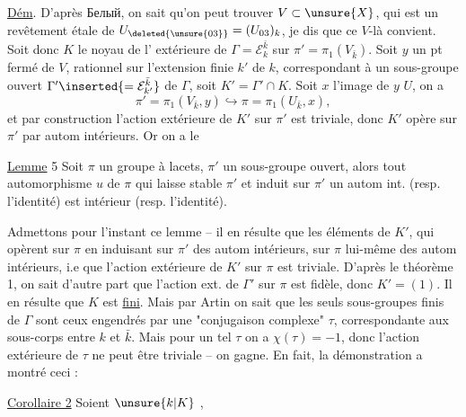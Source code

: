 

\uline{Dém}. D'après Белый, on sait qu'on peut trouver $V\subset\unsure{X}$, qui est un revêtement étale de $U_{\deleted{\unsure{03}}}=(U_{03})_k$, je dis que ce $V$-là convient. Soit donc $K$ le noyau de l' extérieure de $\Gamma=\mathcal E_k^{\bar k}$ sur $\pi'=\pi_1(V_{\bar k})$. Soit $y$ un pt fermé de $V$, rationnel sur l'extension finie $k'$ de $k$, correspondant à un sous-groupe ouvert $\Gamma'\inserted{=\mathcal E_{k'}^{\bar k}}$ de $\Gamma$, soit $K'=\Gamma'\cap K$. Soit $x$ l'image de $y$  $U$, on a
\[
\pi'=\pi_1(V_{\bar k},y)\hookrightarrow\pi=\pi_1(U_{\bar k},x),
\]
et par construction l'action extérieure de $K'$ sur $\pi'$ est triviale, donc $K'$ opère sur $\pi'$ par autom intérieurs. Or on a le

\uline{Lemme} 5 Soit $\pi$ un groupe  à lacets, $\pi'$ un sous-groupe ouvert, alors tout automorphisme $u$ de $\pi$ qui laisse stable $\pi'$ et induit sur $\pi'$ un autom int. (resp. l'identité) est intérieur (resp. l'identité).



Admettons pour l'instant ce lemme -- il en résulte que les éléments de $K'$, qui opèrent sur $\pi$ en induisant sur $\pi'$ des autom intérieurs,  sur $\pi$ lui-même des autom intérieurs, i.e que l'action extérieure de $K'$ sur $\pi$ est triviale. D'après le théorème 1, on sait d'autre part que l'action ext. de $\Gamma'$ sur $\pi$ est fidèle, donc $K'=(1)$. Il en résulte que $K$ est \uline{fini}. Mais par Artin on sait que les seuls sous-groupes finis  de $\Gamma$ sont ceux engendrés par une "conjugaison  complexe" $\tau$, correspondante aux sous-corps   entre $k$ et $\bar k$. Mais pour un tel $\tau$ on a $\chi(\tau)=-1$, donc l'action extérieure de $\tau$ ne peut être triviale -- on gagne. En fait, la démonstration a montré ceci :

\uline{Corollaire 2} Soient $\unsure{k|K}$  ,


